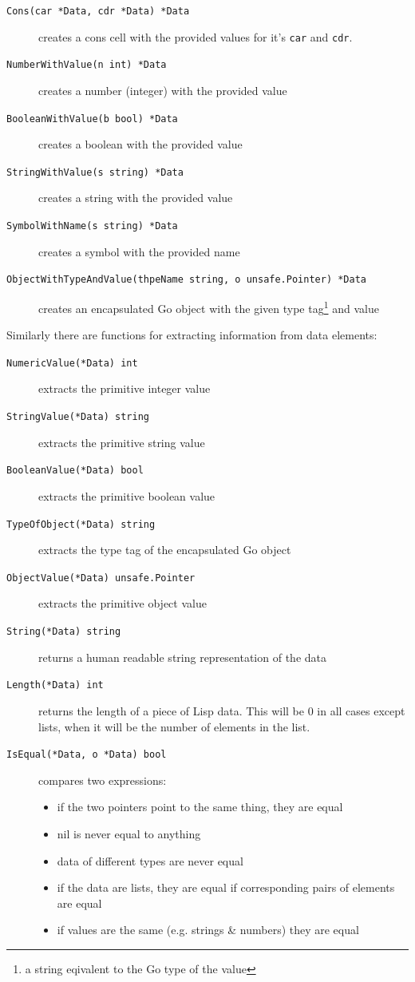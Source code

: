 \documentclass[12pt]{article}
\begin{document}
\begin{description}
\item [{\tt Cons(car *Data, cdr *Data) *Data}] creates a cons cell
  with the provided values for it's \verb|car| and \verb|cdr|.
\item [{\tt NumberWithValue(n int) *Data}] creates a number (integer)
  with the provided value
\item [{\tt BooleanWithValue(b bool) *Data}] creates a boolean with
  the provided value
\item [{\tt StringWithValue(s string) *Data}] creates a string with
  the provided value
\item [{\tt SymbolWithName(s string) *Data}] creates a symbol with the
  provided name
\item [{\tt ObjectWithTypeAndValue(thpeName string, o unsafe.Pointer) *Data}]
  creates an encapsulated Go object with the given type tag\footnote{a
    string eqivalent to the Go type of the value} and value 
\end{description}

\noindent Similarly there are functions for extracting information
from data elements: 

\begin{description}
\item [{\tt NumericValue(*Data) int}] extracts the primitive integer value
\item [{\tt StringValue(*Data) string}] extracts the primitive
  string value
\item [{\tt BooleanValue(*Data) bool}] extracts the primitive
  boolean value
\item [{\tt TypeOfObject(*Data) string}] extracts the type tag of the
    encapsulated Go object
\item [{\tt ObjectValue(*Data) unsafe.Pointer}] extracts the
  primitive object value
\item [{\tt String(*Data) string}] returns a human readable string
  representation of the data 
\item [{\tt Length(*Data) int}] returns the length of a piece of Lisp 
  data. This will be 0 in all cases except lists, when it will be the
  number of elements in the list.
\item [{\tt IsEqual(*Data, o *Data) bool}] compares two expressions:
  \begin{itemize}
  \item if the two pointers point to the same thing, they are equal
  \item nil is never equal to anything
  \item data of different types are never equal
  \item if the data are lists, they are equal if corresponding pairs
    of elements are equal
  \item if values are the same (e.g. strings \& numbers) they are equal
  \end{itemize}
\end{description}
\end{document}
